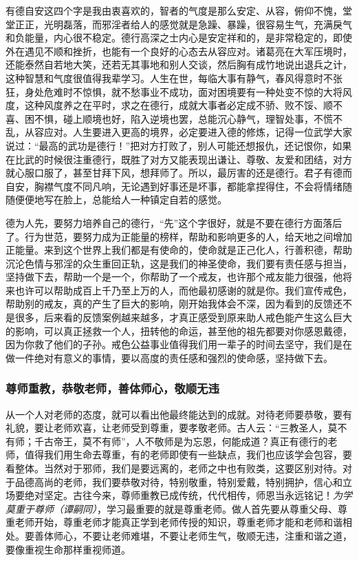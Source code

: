 有德自安这四个字是我由衷喜欢的，智者的气度是那么安定、从容，俯仰不愧，堂堂正正，光明磊落，而邪淫者给人的感觉就是急躁、暴躁，很容易生气，充满戾气和负能量，内心很不稳定。德行高深之士内心是安定祥和的，是非常稳定的，即使外在遇见不顺和挫折，也能有一个良好的心态去从容应对。诸葛亮在大军压境时，还能泰然自若地大笑，还若无其事地和别人交谈，然后胸有成竹地说出退兵之计，这种智慧和气度很值得我辈学习。人生在世，每临大事有静气，春风得意时不张狂，身处危难时不惊惧，就不愁事业不成功，面对困境要有一种处变不惊的大将风度，这种风度养之在平时，求之在德行，成就大事者必定成不骄、败不馁、顺不喜、困不惧，碰上顺境也好，陷入逆境也罢，总能沉心静气，理智处事，不慌不乱，从容应对。人生要进入更高的境界，必定要进入德的修炼，记得一位武学大家说过：“最高的武功是德行！”把对方打败了，别人可能还想报仇，还记恨你，如果在比武的时候很注重德行，既胜了对方又能表现出谦让、尊敬、友爱和团结，对方就心服口服了，甚至甘拜下风，想拜师了。所以，最厉害的还是德行。君子有德而自安，胸襟气度不同凡响，无论遇到好事还是坏事，都能拿捏得住，不会将情绪随随便便地写在脸上，总能给人一种镇定自若的感觉。

德为人先，要努力培养自己的德行，“先”这个字很好，就是不要在德行方面落后了。行为世范，要努力成为正能量的榜样，帮助和影响更多的人，给天地之间增加正能量。来到这个世界上我们都是有使命的，使命就是正己化人，行善积德，帮助沉沦色情与邪淫的众生重回正轨，这是我们的神圣使命，我们要有责任感与担当，坚持做下去，帮助一个是一个，你帮助了一个戒友，也许那个戒友能力很强，他将来也许可以帮助成百上千乃至上万的人，而他最初感谢的就是你。我们宣传戒色，帮助别的戒友，真的产生了巨大的影响，刚开始我体会不深，因为看到的反馈还不是很多，后来看的反馈案例越来越多，才真正感受到原来助人戒色能产生这么巨大的影响，可以真正拯救一个人，扭转他的命运，甚至他的祖先都要对你感恩戴德，因为你救了他们的子孙。戒色公益事业值得我们用一辈子的时间去坚守，我们是在做一件绝对有意义的事情，要以高度的责任感和强烈的使命感，坚持做下去。

\subsubsection{尊师重教，恭敬老师，善体师心，敬顺无违}

从一个人对老师的态度，就可以看出他最终能达到的成就。对待老师要恭敬，要有礼貌，要让老师欢喜，让老师受到尊重，要孝敬老师。古人云：“三教圣人，莫不有师；千古帝王，莫不有师”，人不敬师是为忘恩，何能成道？真正有德行的老师，值得我们用生命去尊重，有的老师即使有一些缺点，我们也应该学会包容，要看整体。当然对于邪师，我们是要远离的，老师之中也有败类，这要区别对待。对于品德高尚的老师，我们要恭敬对待，特别敬重，特别爱戴，特别拥护，信心和立场要绝对坚定。古往今来，尊师重教已成传统，代代相传，师恩当永远铭记！\textit{为学莫重于尊师（谭嗣同）}，学习最重要的就是尊重老师。做人首先要从尊重父母、尊重老师开始，尊重老师才能真正学到老师传授的知识，尊重老师才能和老师和谐相处。要善体师心，不要让老师难堪，不要让老师生气，敬顺无违，注重和谐之道，要像重视生命那样重视师道。

